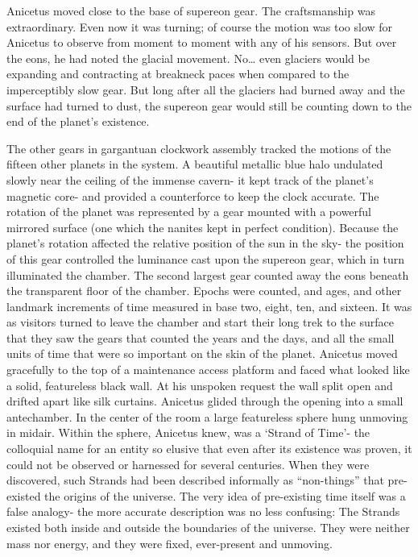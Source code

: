 \documentclass[a4paper]{article}
\begin{document}
Anicetus moved close to the base of supereon gear. The craftsmanship was extraordinary. Even now it was turning; of course the motion was too slow for Anicetus to observe from moment to moment with any of his sensors. But over the eons, he had noted the glacial movement. No… even glaciers would be expanding and contracting at breakneck paces when compared to the imperceptibly slow gear. But long after all the glaciers had burned away and the surface had turned to dust, the supereon gear would still be counting down to the end of the planet’s existence.

The other gears in gargantuan clockwork assembly tracked the motions of the fifteen other planets in the system. A beautiful metallic blue halo undulated slowly near the ceiling of the immense cavern- it kept track of the planet’s magnetic core- and provided a counterforce to keep the clock accurate.
The rotation of the planet was represented by a gear mounted with a powerful mirrored surface (one which the nanites kept in perfect condition). Because the planet’s rotation affected the relative position of the sun in the sky- the position of this gear controlled the luminance cast upon the supereon gear, which in turn illuminated the chamber. The second largest gear counted away the eons beneath the transparent floor of the chamber. Epochs were counted, and ages, and other landmark increments of time measured in base two, eight, ten, and sixteen.
It was as visitors turned to leave the chamber and start their long trek to the surface that they saw the gears that counted the years and the days, and all the small units of time that were so important on the skin of the planet.
Anicetus moved gracefully to the top of a maintenance access platform and faced what looked like a solid, featureless black wall. At his unspoken request the wall split open and drifted apart like silk curtains.
Anicetus glided through the opening into a small antechamber. In the center of the room a large featureless sphere hung unmoving in midair. Within the sphere, Anicetus knew, was a ‘Strand of Time’- the colloquial name for an entity so elusive that even after its existence was proven, it could not be observed or harnessed for several centuries.
When they were discovered, such Strands had been described informally as “non-things” that pre-existed the origins of the universe. The very idea of pre-existing time itself was a false analogy- the more accurate description was no less confusing: The Strands existed both inside and outside the boundaries of the universe. They were neither mass nor energy, and they were fixed, ever-present and unmoving.
\end{document}
